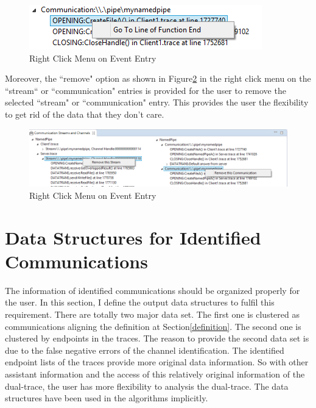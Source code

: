 \begin{figure}[H]
\centerline{\includegraphics{Figures/gotoend}}
 \caption{Right Click Menu on Event Entry}
\label{idenview}
\end{figure}

Moreover, the ``remove" option as shown in Figure\ref{remove} in the right click menu on the ``stream“ or ``communication" entries is provided for the user to remove the selected ``stream" or ``communication" entry. This provides the user the flexibility to get rid of the data that they don't care.

\begin{figure}[H]
\centerline{\includegraphics[scale=0.7]{Figures/remove}}
 \caption{Right Click Menu on Event Entry}
\label{remove}
\end{figure}

\section{Data Structures for Identified Communications}
The information of identified communications should be organized properly for the user. In this section, I define the output data structures to fulfil this requirement. There are totally two major data set. The first one is clustered as communications aligning the definition at Section\ref{definition}. The second one is clustered by endpoints in the traces. The reason to provide the second data set is due to the false negative errors of the channel identification. The identified endpoint lists of the traces provide more original data information. So with other assistant information and the access of this relatively original information of the dual-trace, the user has more flexibility to analysis the dual-trace. The data structures have been used in the algorithms implicitly.

